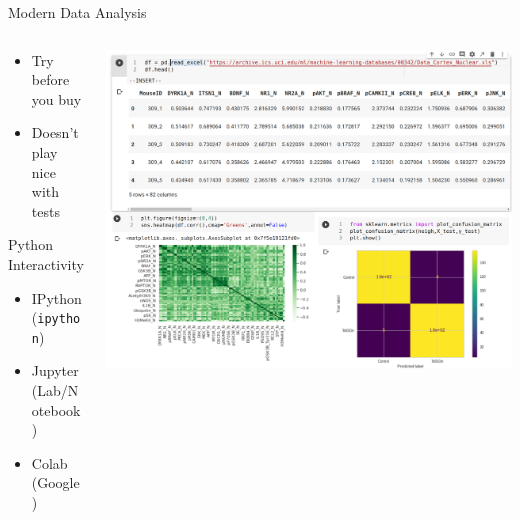 \documentclass[bigger,unknownkeysallowed,aspectratio=169,red,colorblocks]{beamer}
\begin{document}
\begin{frame}[label={sec:org407b254},fragile]{Modern Data Analysis}
 \begin{columns}
\begin{column}{0.5\columnwidth}
\begin{itemize}
\item Try before you buy
\item Doesn't play nice with tests
\end{itemize}
\begin{block}{Python Interactivity}
\begin{itemize}
\item IPython (\texttt{ipython})
\item Jupyter (Lab/Notebook)
\item Colab (Google)
\end{itemize}
\end{block}
\end{column}
\begin{column}{0.5\columnwidth}
\begin{center}
\includegraphics[width=.9\linewidth]{images/Modern_Data_Analysis/2020-09-20_04-32-08_screenshot.png}
\end{center}
\end{column}
\end{columns}
\end{frame}
\end{document}
